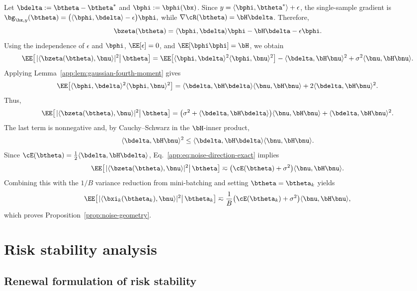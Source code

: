 \documentclass[11pt]{article}
\begin{document}
Let \(\bdelta:=\btheta-\btheta^*\) and \(\bphi:=\bphi(\bx)\). Since \(y=\langle\bphi,\btheta^*\rangle+\epsilon\), the single-sample gradient is
$
\bg_{\bx,y}(\btheta)
=
\bigl(\langle\bphi,\bdelta\rangle-\epsilon\bigr)\bphi,
$
while \(\nabla\cR(\btheta)=\bH\bdelta\). Therefore,
\[
\bzeta(\btheta)
=
\langle\bphi,\bdelta\rangle\bphi-\bH\bdelta-\epsilon\bphi.
\]
Using the independence of \(\epsilon\) and \(\bphi\), \(\EE[\epsilon]=0\), and $\EE[\bphi\bphi]=\bH$, we obtain
\[
\EE\!\left[\left.|\langle\bzeta(\btheta),\bnu\rangle|^2\right|\btheta\right]
=
\EE\!\left[\langle\bphi,\bdelta\rangle^2\langle\bphi,\bnu\rangle^2\right]
-\langle\bdelta,\bH\bnu\rangle^2
+\sigma^2\langle\bnu,\bH\bnu\rangle.
\]
Applying Lemma~\ref{app:lem:gaussian-fourth-moment}  gives
\[
\EE\!\left[\langle\bphi,\bdelta\rangle^2\langle\bphi,\bnu\rangle^2\right]
=
\langle\bdelta,\bH\bdelta\rangle\langle\bnu,\bH\bnu\rangle
+
2\langle\bdelta,\bH\bnu\rangle^2.
\]
Thus,
\begin{equation}
\label{app:eq:noise-direction-exact}
\EE\!\left[\left.|\langle\bzeta(\btheta),\bnu\rangle|^2\right|\btheta\right]
=
\bigl(\sigma^2+\langle\bdelta,\bH\bdelta\rangle\bigr)\langle\bnu,\bH\bnu\rangle
+
\langle\bdelta,\bH\bnu\rangle^2.
\end{equation}
The last term is nonnegative and, by Cauchy--Schwarz in the \(\bH\)-inner product,
\[
\langle\bdelta,\bH\bnu\rangle^2
\leq
\langle\bdelta,\bH\bdelta\rangle
\langle\bnu,\bH\bnu\rangle.
\]
Since \(\cE(\btheta)=\frac12\langle\bdelta,\bH\bdelta\rangle\), Eq.~\eqref{app:eq:noise-direction-exact} implies
\[
\EE\!\left[\left.|\langle\bzeta(\btheta),\bnu\rangle|^2\right|\btheta\right]
\eqsim
\bigl(\cE(\btheta)+\sigma^2\bigr)\langle\bnu,\bH\bnu\rangle.
\]
Combining this with the \(1/B\) variance reduction from mini-batching and setting \(\btheta=\btheta_k\) yields
\[
\EE\!\left[\left.|\langle\bxi_k(\btheta_k),\bnu\rangle|^2\right|\btheta_k\right]
\eqsim
\frac1B\bigl(\cE(\btheta_k)+\sigma^2\bigr)\langle\bnu,\bH\bnu\rangle,
\]
which proves Proposition~\ref{prop:noise-geometry}.



\section{Risk stability analysis}
\label{app:sec:stability}

\subsection{Renewal formulation of risk stability}
\label{app:subsec:label-noise-stability}
\end{document}

